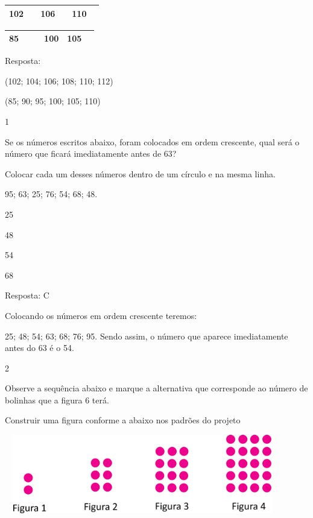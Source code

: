 \begin{longtable}[]{@{}llllll@{}}
\toprule
102 & & 106 & & 110 &\tabularnewline
\bottomrule
\end{longtable}

\begin{escolha}

\item
\end{escolha}

\begin{longtable}[]{@{}llllll@{}}
\toprule
85 & & & 100 & 105 &\tabularnewline
\bottomrule
\end{longtable}

Resposta:

\begin{escolha}

\item
  (102; 104; 106; 108; 110; 112)
\item
  (85; 90; 95; 100; 105; 110)
\end{escolha}


\num{1}

Se os números escritos abaixo, foram colocados em ordem crescente, qual
será o número que ficará imediatamente antes de 63?

Colocar cada um desses números dentro de um círculo e na mesma linha.

95; 63; 25; 76; 54; 68; 48.

\begin{escolha}

\item
  25
\item
  48
\item
  54
\item
  68
\end{escolha}

Resposta: C

Colocando os números em ordem crescente teremos:

25; 48; 54; 63; 68; 76; 95. Sendo assim, o número que aparece
imediatamente antes do 63 é o 54.

\num{2}

Observe a sequência abaixo e marque a alternativa que corresponde ao
número de bolinhas que a figura 6 terá.

Construir uma figura conforme a abaixo nos padrões do projeto

\includegraphics[width=4.75875in,height=1.35012in]{media/image37.png}

